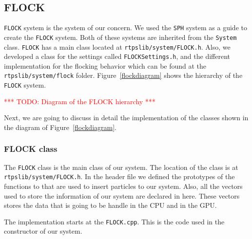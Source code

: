 \subsection{FLOCK}
\texttt{FLOCK} system is the system of our concern. We used the \texttt{SPH} system as a guide to create the \texttt{FLOCK} system. Both of these systems are inherited from the \texttt{System} class. \texttt{FLOCK} has a main class located at \texttt{rtpslib/system/FLOCK.h}. Also, we developed a class for the settings called \texttt{FLOCKSettings.h}, and the different implementation for the flocking behavior which can be found at the \texttt{rtpslib/system/flock} folder. Figure~\ref{flockdiagram} shows the hierarchy of the \texttt{FLOCK} system.

\textcolor{red}{*** TODO: Diagram of the FLOCK hierarchy ***}

Next, we are going to discuss in detail the implementation of the classes shown in the diagram of Figure~\ref{flockdiagram}.

\subsubsection{FLOCK class}
The \texttt{FLOCK} class is the main class of our system. The location of the class is at \texttt{rtpslib/system/FLOCK.h}. In the header file we defined the prototypes of the functions to that are used to insert particles to our system. Also, all the vectors used to store the information of our system are declared in here. These vectors stores the data that is going to be handle in the CPU and in the GPU.

The implementation starts at the \texttt{FLOCK.cpp}. This is the code used in the constructor of  our system.

